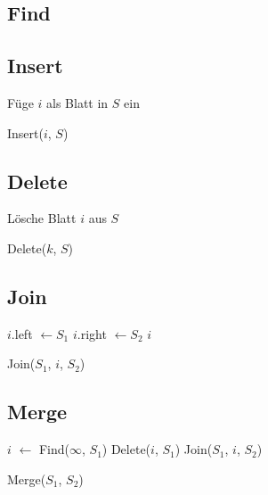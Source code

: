 \documentclass[a4paper]{scrreprt}
\theoremstyle{definition}
\begin{document}
\subsection{Find}
\label{sec:find}

\subsection{Insert}
\label{sec:insert}

\begin{algorithm}[H]
		Füge $i$ als Blatt in $S$ ein \;
	\caption{Insert($i$, $S$)}
\end{algorithm}

\subsection{Delete}
\label{sec:delete}

\begin{algorithm}[H]
		Lösche Blatt $i$ aus $S$ \;
	\caption{Delete($k$, $S$)}
\end{algorithm}

\subsection{Join}
\label{sec:join}

\begin{algorithm}[H]
		$i$.left $\gets S_1$ \;
		$i$.right $\gets S_2$ \;
		\Return $i$
	\caption{Join($S_1$, $i$, $S_2$)}
\end{algorithm}

\subsection{Merge}
\label{sec:merge}

\begin{algorithm}[H]
		$i$ $\gets$ Find($\infty$, $S_1$) 
		Delete($i$, $S_1$) \;
		\Return Join($S_1$, $i$, $S_2$) \;
	\caption{Merge($S_1$, $S_2$)}
\end{algorithm}
\end{document}
